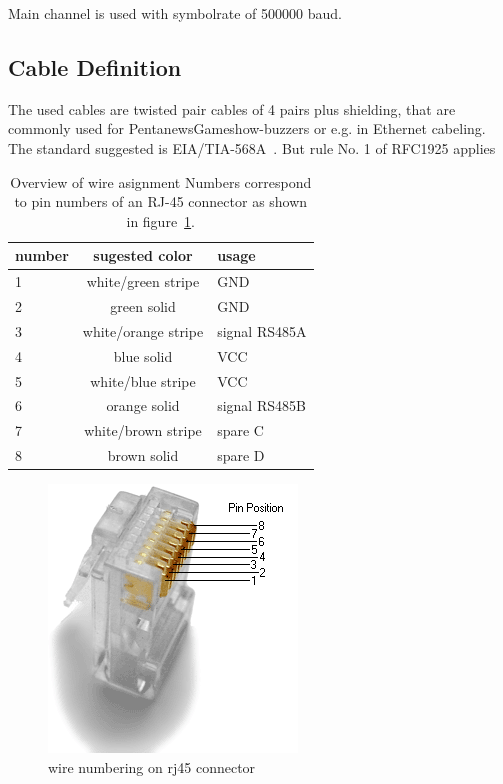\documentclass[a4paper,12pt]{scrartcl}
\begin{document}
Main channel is used with symbolrate of 500000 baud. 



\subsection{Cable Definition}
The used cables are twisted pair cables of 4 pairs plus shielding, that are commonly used for  PentanewsGameshow-buzzers or e.g. in Ethernet cabeling.
The standard suggested is EIA/TIA-568A~\cite{EIA568}.
But rule No. 1 of RFC1925 \cite{RFC1925} applies

\begin{table}
	\centering
	\begin{tabular}{l c l}
		number        & sugested color      & usage \\
		\hline
		1             & white/green stripe  &   GND \\
		2             & green solid         &   GND \\
		3             & white/orange stripe &   signal RS485A\\
		4             & blue solid          &   VCC \\
		5             & white/blue stripe   &   VCC \\
		6             & orange solid        &   signal RS485B\\
		7             & white/brown stripe  &   spare C \\
		8             & brown solid         &   spare D \\
	\end{tabular}
	\caption{%
	Overview of wire asignment  \newline%
	Numbers correspond to pin numbers of an RJ-45 connector as shown in figure~\ref{fig:rj45}.
	}
	\label{tab:wires}
\end{table}

\begin{figure}
	\centering
	\includegraphics[scale=.7]{png/Rj45plug-8p8c.png}
	\caption{wire numbering on rj45 connector}
	\label{fig:rj45}
\end{figure}
\end{document}

